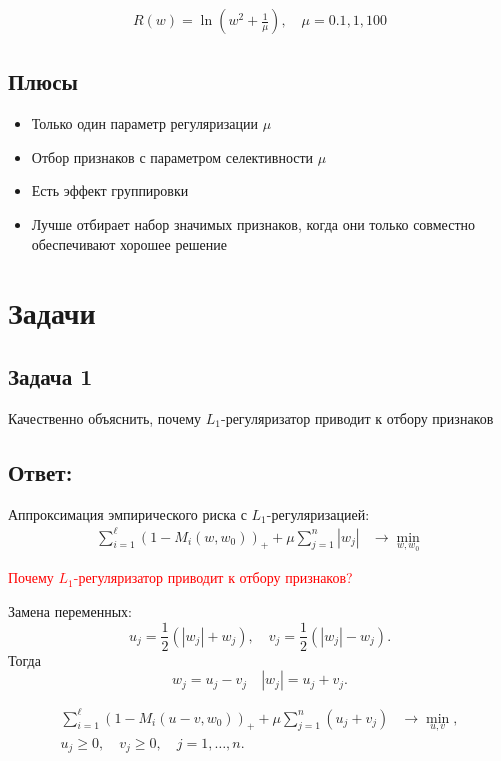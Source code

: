 \begin{align*}
    R(w) = \ln(w^2 + \frac{1}{\mu}), \quad \mu = 0.1, 1, 100
\end{align*}

\subsection*{Плюсы}
\begin{itemize}
    \item Только один параметр регуляризации \(\mu\)
    \item Отбор признаков с параметром селективности \(\mu\)
    \item Есть эффект группировки
    \item Лучше отбирает набор значимых признаков, когда они только совместно обеспечивают хорошее решение
\end{itemize}

\section{Задачи}

\subsection{Задача 1}

Качественно объяснить, почему $L_1$-регуляризатор приводит к отбору признаков

\subsection{Ответ:}

Аппроксимация эмпирического риска с \(L_1\)-регуляризацией:
\begin{align*}
    \sum_{i=1}^{\ell} \left(1 - M_i(w, w_0)\right)_+ + \mu \sum_{j=1}^{n} |w_j| & \rightarrow \min_{w, w_0}
\end{align*}

\textcolor{red}{Почему \(L_1\)-регуляризатор приводит к отбору признаков?}

Замена переменных: 
\[
u_j = \frac{1}{2} (|w_j| + w_j), \quad v_j = \frac{1}{2} (|w_j| - w_j).
\]
Тогда 
\[
w_j = u_j - v_j \quad |w_j| = u_j + v_j.
\]

\begin{align*}
    \sum_{i=1}^{\ell} \left(1 - M_i(u - v, w_0)\right)_+ + \mu \sum_{j=1}^{n} (u_j + v_j) & \rightarrow \min_{u, v}, \\
    u_j \geq 0, \quad v_j \geq 0, \quad j = 1, \ldots, n.
\end{align*}

